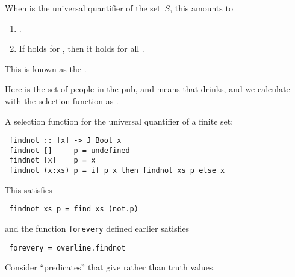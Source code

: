 \documentclass%
[%
Screen4to3,
]{foils}
\begin{document}
\vfill
{}




When  is the universal quantifier
 of the set~$S$, this amounts to
\begin{enumerate}
\item {}.
\item If  holds for ,
  then it holds for all .
\end{enumerate}

\vfill
This is known as the .


Here  is the set of people in the pub, and
 means that  drinks, and we calculate
 with the selection function as .



A selection function for the universal quantifier of a finite set:
\begin{verbatim}
 findnot :: [x] -> J Bool x
 findnot []     p = undefined
 findnot [x]    p = x
 findnot (x:xs) p = if p x then findnot xs p else x
\end{verbatim}
This satisfies
\begin{verbatim}
 findnot xs p = find xs (not.p)
\end{verbatim}
and the function \verb+forevery+ defined earlier satisfies
\begin{verbatim}
 forevery = overline.findnot
\end{verbatim}


Consider ``predicates'' that give  rather than
 truth values.
\end{document}

